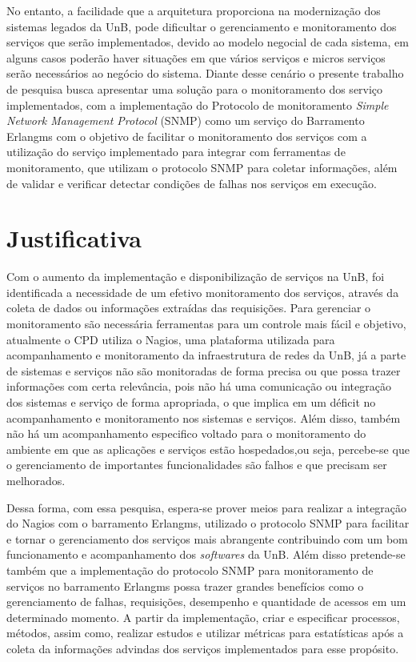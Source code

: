\documentclass[qualidr]{eesc}
\begin{document}
No entanto, a facilidade que a arquitetura proporciona na modernização dos sistemas legados da UnB, pode dificultar o gerenciamento e monitoramento dos serviços que serão implementados, devido ao modelo negocial de cada sistema, em alguns casos poderão haver situações em que vários serviços e micros serviços serão necessários ao negócio do sistema. Diante desse cenário o presente trabalho de pesquisa busca apresentar uma solução para o monitoramento dos serviço implementados, com a implementação do Protocolo de monitoramento \textit{Simple Network Management Protocol} (SNMP) como um serviço do Barramento Erlangms com o objetivo de facilitar o monitoramento dos serviços com a utilização do serviço implementado para integrar com ferramentas de monitoramento, que utilizam o protocolo SNMP para coletar informações, além de validar e verificar detectar condições de falhas nos serviços em execução.

\section{Justificativa}

Com o aumento da implementação e disponibilização de serviços na UnB, foi identificada a necessidade de um efetivo monitoramento dos serviços, através da coleta de dados ou informações extraídas das requisições. Para gerenciar o monitoramento são necessária ferramentas para um controle mais fácil e objetivo, atualmente o CPD utiliza o Nagios, uma plataforma utilizada para acompanhamento e monitoramento da infraestrutura de redes da UnB, já a parte de sistemas e serviços não são monitoradas de forma precisa ou que possa trazer informações com certa relevância, pois não há uma comunicação ou integração dos sistemas e serviço de forma apropriada, o que implica em um déficit no acompanhamento e monitoramento nos sistemas e serviços. Além disso, também não há um acompanhamento especifico voltado para o monitoramento do ambiente em que as aplicações e serviços estão hospedados,ou seja, percebe-se que o gerenciamento de importantes funcionalidades são falhos e que precisam ser melhorados.

Dessa forma, com essa pesquisa, espera-se prover meios para realizar a integração do Nagios com o barramento Erlangms, utilizado o protocolo SNMP para facilitar e tornar o gerenciamento dos serviços mais abrangente contribuindo com um bom funcionamento e acompanhamento dos \textit{softwares} da UnB. Além disso pretende-se também que a implementação do protocolo SNMP para monitoramento de serviços no barramento Erlangms possa trazer grandes benefícios como o gerenciamento de falhas, requisições, desempenho e quantidade de acessos em um determinado momento. A partir da implementação, criar e especificar processos, métodos, assim como, realizar estudos e utilizar métricas para estatísticas após a coleta da informações advindas dos serviços implementados para esse propósito. 
\end{document}
